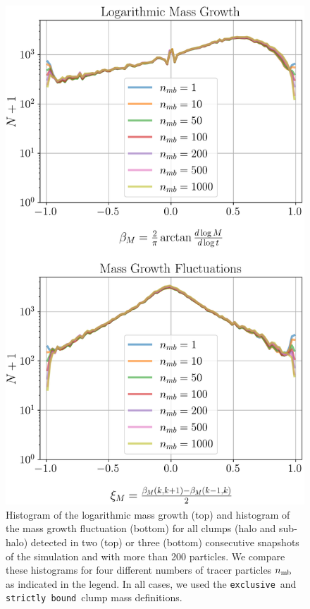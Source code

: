 \documentclass[a4paper,twocolumn,fleqn,usenatbib]{mnras}
\newcommand{\exc}{\texttt{exclusive}}
\newcommand{\sad}{\texttt{strictly bound}}
\begin{document}
\begin{figure}
  \centering
  \includegraphics[width=.9\linewidth, keepaspectratio]{images/tree-statistics-my-threshold/mass-statistics-ntrace.png}%
  \caption{ Histogram of the logarithmic mass growth (top) and
    histogram of the mass growth fluctuation (bottom) for all clumps
    (halo and sub-halo) detected in two (top) or three (bottom)
    consecutive snapshots of the simulation and with more than 200
    particles.  We compare these histograms for four different numbers of
    tracer particles $n_{\rm mb}$ as indicated in the legend.  In all
    cases, we used the \exc\ and \sad\ clump mass definitions.
  }%
  \label{fig:ntracers_masses}
\end{figure}
\end{document}
